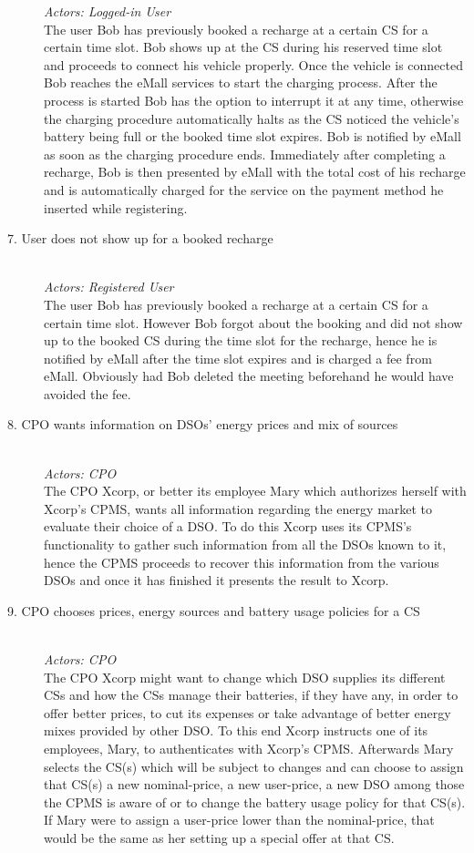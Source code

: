 \documentclass[11pt]{article}
\begin{document}
\begin{description}
        \textit{Actors: Logged-in User} \\
        The user Bob has previously booked a recharge at a certain CS for a certain time slot. Bob shows up at the CS during his reserved time slot and proceeds to connect his vehicle properly. Once the vehicle is connected Bob reaches the eMall services to start the charging process. After the process is started Bob has the option to interrupt it at any time, otherwise the charging procedure automatically halts as the CS noticed the vehicle’s battery being full or the booked time slot expires. Bob is notified by eMall as soon as the charging procedure ends. Immediately after completing a recharge, Bob is then presented by eMall with the total cost of his recharge and is automatically charged for the service on the payment method he inserted while registering.
    \item [7. User does not show up for a booked recharge] \hfill \\
        \textit{Actors: Registered User} \\
        The user Bob has previously booked a recharge at a certain CS for a certain time slot. However Bob forgot about the booking and did not show up to the booked CS during the time slot for the recharge, hence he is notified by eMall after the time slot expires and is charged a fee from eMall. Obviously had Bob deleted the meeting beforehand he would have avoided the fee.
    \item [8. CPO wants information on DSOs’ energy prices and mix of sources] \hfill \\
        \textit{Actors: CPO} \\
        The CPO Xcorp, or better its employee Mary which authorizes herself with Xcorp's CPMS, wants all information regarding the energy market to evaluate their choice of a DSO. To do this Xcorp uses its CPMS’s functionality to gather such information from all the DSOs known to it, hence the CPMS proceeds to recover this information from the various DSOs and once it has finished it presents the result to Xcorp.
    \item [9. CPO chooses prices, energy sources and battery usage policies for a CS] \hfill \\
        \textit{Actors: CPO} \\
        The CPO Xcorp might want to change which DSO supplies its different CSs and how the CSs manage their batteries, if they have any, in order to offer better prices, to cut its expenses or take advantage of better energy mixes provided by other DSO. To this end Xcorp instructs one of its employees, Mary, to authenticates with Xcorp's CPMS. Afterwards Mary selects the CS(s) which will be subject to changes and can choose to assign that CS(s) a new nominal-price, a new user-price, a new DSO among those the CPMS is aware of or to change the battery usage policy for that CS(s). If Mary were to assign a user-price lower than the nominal-price, that would be the same as her setting up a special offer at that CS.

\end{description}
\end{document}
